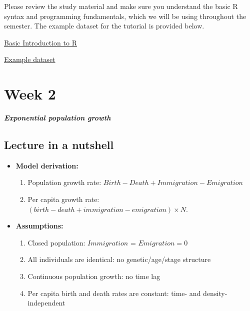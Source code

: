 \documentclass[
]{book}
\providecommand{\tightlist}{%
  \setlength{\itemsep}{0pt}\setlength{\parskip}{0pt}}
\begin{document}
Please review the study material and make sure you understand the basic R syntax and programming fundamentals, which we will be using throughout the semester. The example dataset for the tutorial is provided below.

\href{./Assignments/Week1_Basic\%20Introduction\%20to\%20R.pdf}{Basic Introduction to R}

\href{./Assignments/example_dat.txt}{Example dataset}

\hypertarget{week-2}{%
\chapter*{Week 2}\label{week-2}}

\textbf{\emph{Exponential population growth}}

\hypertarget{lecture-in-a-nutshell-1}{%
\section*{Lecture in a nutshell}\label{lecture-in-a-nutshell-1}}

\begin{itemize}
\tightlist
\item
  \textbf{Model derivation:}

  \begin{enumerate}
  \def\labelenumi{\arabic{enumi}.}
  \tightlist
  \item
    Population growth rate: \(Birth - Death + Immigration - Emigration\)
  \item
    Per capita growth rate: \((birth - death + immigration - emigration)\times N\).
  \end{enumerate}
\end{itemize}

\begin{itemize}
\tightlist
\item
  \textbf{Assumptions:}

  \begin{enumerate}
  \def\labelenumi{\arabic{enumi}.}
  \tightlist
  \item
    Closed population: \(Immigration\) = \(Emigration = 0\)
  \item
    All individuals are identical: no genetic/age/stage structure
  \item
    Continuous population growth: no time lag
  \item
    Per capita birth and death rates are constant: time- and density-independent
  \end{enumerate}
\end{itemize}
\end{document}
